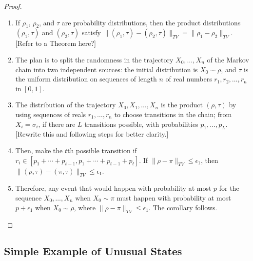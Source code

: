 \documentclass[12pt]{article}
\begin{document}
\begin{proof}
    \begin{enumerate}
        \item
            If \( \rho_1 \), \( \rho_{2} \), and \( \tau \) are
            probability distributions, then the product distributions \(
            (\rho_1 , \tau ) \) and \( (\rho_2 , \tau ) \) satisfy \( \|
            (\rho_1 , \tau )- (\rho_2, \tau )\|_{TV} = \|\rho_1- \rho_2
            \|_{TV} \). [Refer to a Theorem here?]
        \item
            The plan is to split the randomness in the trajectory \( X_0,
            \dots , X_n \) of the Markov chain into two independent
            sources:  the initial distribution is \( X_0 \sim \rho \),
            and \( \tau \) is the uniform distribution on sequences of
            length \( n \) of real numbers \( r_1 , r_2, \dots, r_n \)
            in \( [0, 1] \).
        \item 
            The distribution of the trajectory \( X_0 , X_1,\dots, X_n \)
            is the product \( (\rho, \tau ) \) by using sequences of
            reals \( r_1, \dots, r_n \) to choose transitions in the
            chain; from \( X_i = \sigma_i \), if there are \( L \)
            transitions possible, with probabilities \( p_1, \dots,
            p_L \).
            [Rewrite this and following steps for better clarity.]
        \item
            Then, make the \( t \)th possible transition if \( r_i \in [p_1
            + \cdots + p_{t-1}, p_1 + \cdots + p_{t-1 }+ p_t] \).  If \(
            \|\rho- \pi\|_{TV} \le \epsilon_1 \), then \( \|(\rho, \tau
            )- (\pi, \tau )\|_{TV} \le \epsilon_1 \).
        \item
            Therefore, any event that would happen with probability at
            most \( p \) for the sequence \( X_0 ,\dots, X_n \) when \(
            X_0 \sim \pi \) must happen with probability at most \( p +
            \epsilon_1 \) when \( X_0 \sim \rho \), where \( \|\rho- \pi\|_
            {TV} \le \epsilon_1 \).  The corollary follows.
    \end{enumerate}
\end{proof}

\subsection*{Simple Example of Unusual States}
\end{document}
